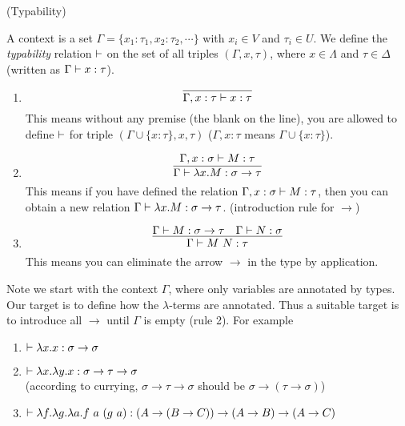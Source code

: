 \begin{definition} (Typability)

A context is a set $\Gamma = \{x_1: \tau_1, x_2:\tau_2, \cdots\}$ 
with $x_i\in V$ and $\tau_i\in U$. We define the {\it typability}
relation $\vdash$ on the set of all triples $(\Gamma, x, \tau)$, where 
$x\in\Lambda$ and $\tau\in\Delta$ (written as $\Gamma\vdash x:\tau$).

\begin{enumerate}
    \item $$\infer{\Gamma, x:\tau\proves x:\tau}{}$$
    This means without any premise (the blank on the line), you
    are allowed to define $\vdash$ for triple 
    $(\Gamma\cup\{x:\tau\}, x, \tau)$
    ($\Gamma,x:\tau$ means $\Gamma\cup\{x:\tau\}$).
    \item $$\infer{\Gamma\proves\lambda x.M:\sigma\to\tau}{\Gamma,x:\sigma\proves M:\tau}$$
    This means if you have defined the relation $\Gamma,x:\sigma\vdash M:\tau$,
    then you can obtain a new relation $\Gamma\vdash\lambda x.M:\sigma\to\tau$.
    (introduction rule for $\to$)
    \item $$\infer{\Gamma\proves M\ N:\tau}{\Gamma\proves M:\sigma\to\tau & \Gamma\proves N:\sigma}$$
    This means you can eliminate the arrow $\to$ in the type by application.
\end{enumerate}

\end{definition}

Note we start with the context $\Gamma$, where only variables are annotated
by types. Our target is to define how the $\lambda$-terms are annotated.
Thus a suitable target is to introduce all $\to$ until $\Gamma$ is empty
(rule 2). For example
\begin{enumerate}
    \item $\vdash \lambda x.x: \sigma\to\sigma$
    \item $\vdash \lambda x.\lambda y.x: \sigma\to\tau\to\sigma$ \\
    (according to currying, $\sigma\to\tau\to\sigma$ should be 
    $\sigma\to(\tau\to\sigma)$)
    \item $\vdash \lambda f.\lambda g.\lambda a. f\ a\ (g\ a):
    (A\to(B\to C))\to(A\to B)\to(A\to C)$
\end{enumerate}


